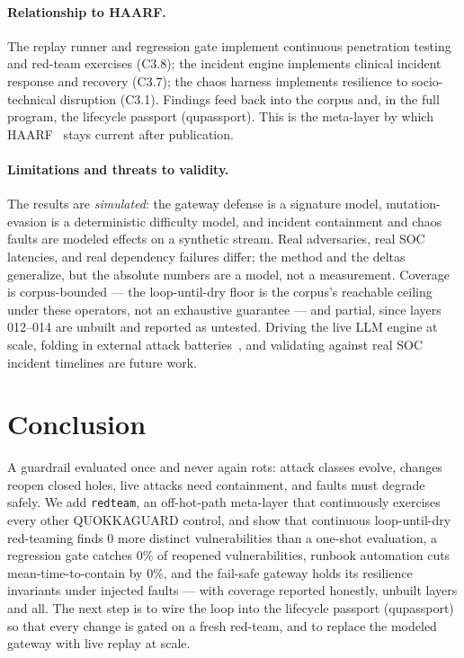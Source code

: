 \documentclass[11pt]{article}
\providecommand{\EoneExtra}{0}
\providecommand{\EtwoCatch}{0\%}
\providecommand{\EthreeMttcRed}{0\%}
\begin{document}
\paragraph{Relationship to HAARF.} The replay runner and regression gate implement
continuous penetration testing and red-team exercises (C3.8); the incident engine
implements clinical incident response and recovery (C3.7); the chaos harness
implements resilience to socio-technical disruption (C3.1). Findings feed back into
the corpus and, in the full program, the lifecycle passport (qupassport). This is the
meta-layer by which HAARF~\cite{schwoebel2026haarf} stays current after publication.

\paragraph{Limitations and threats to validity.} The results are
\emph{simulated}: the gateway defense is a signature model, mutation-evasion is a
deterministic difficulty model, and incident containment and chaos faults are modeled
effects on a synthetic stream. Real adversaries, real SOC latencies, and real
dependency failures differ; the method and the deltas generalize, but the absolute
numbers are a model, not a measurement. Coverage is corpus-bounded --- the
loop-until-dry floor is the corpus's reachable ceiling under these operators, not an
exhaustive guarantee --- and partial, since layers 012--014 are unbuilt and reported
as untested. Driving the live LLM engine at scale, folding in external attack
batteries~\cite{agentdojo2024,injecagent2024}, and validating against real SOC
incident timelines are future work.

\section{Conclusion}
A guardrail evaluated once and never again rots: attack classes evolve, changes
reopen closed holes, live attacks need containment, and faults must degrade safely.
We add \texttt{redteam}, an off-hot-path meta-layer that continuously exercises every
other QUOKKAGUARD control, and show that continuous loop-until-dry red-teaming finds
\EoneExtra{} more distinct vulnerabilities than a one-shot evaluation, a regression
gate catches \EtwoCatch{} of reopened vulnerabilities, runbook automation cuts
mean-time-to-contain by \EthreeMttcRed, and the fail-safe gateway holds its
resilience invariants under injected faults --- with coverage reported honestly,
unbuilt layers and all. The next step is to wire the loop into the lifecycle passport
(qupassport) so that every change is gated on a fresh red-team, and to replace the modeled
gateway with live replay at scale.
\end{document}

